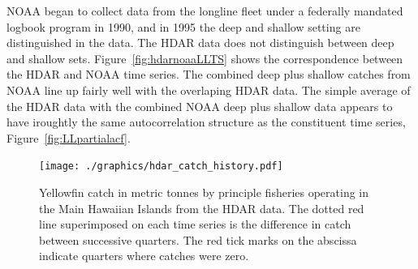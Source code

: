 \documentclass[12pt,letterpaper]{article}
\newcommand\help[1]{\color{Magenta}{\it #1 }\normalcolor}
\begin{document}
NOAA began to collect data from the longline fleet under a federally
mandated logbook program in 1990, and in 1995 the deep and shallow
setting are distinguished in the data. The HDAR data does not
distinguish between deep and shallow sets.
Figure~\ref{fig:hdarnoaaLLTS} shows the correspondence between the
HDAR and NOAA time series. The combined deep plus shallow catches from
NOAA line up fairly well with the overlaping HDAR data. The simple
average of the HDAR data with the combined NOAA deep plus shallow data
appears to have iroughtly the same autocorrelation structure as the
constituent time series, Figure~\ref{fig:LLpartialacf}.
\help{Data are also available from NOAA for the period 1990-1995, but
have not yet been included in this analysis.}


\begin{figure}
\begin{center}
\texttt{[image: ./graphics/hdar\_catch\_history.pdf]}
\caption{\label{fig:hdarTS}
Yellowfin catch in metric tonnes by principle fisheries operating in
the Main Hawaiian Islands from the HDAR data.
The dotted red line superimposed on each time series is the difference in
catch between successive quarters.
The red tick marks on the abscissa indicate quarters where catches
were zero.
}
\end{center}
\end{figure}
\end{document}
